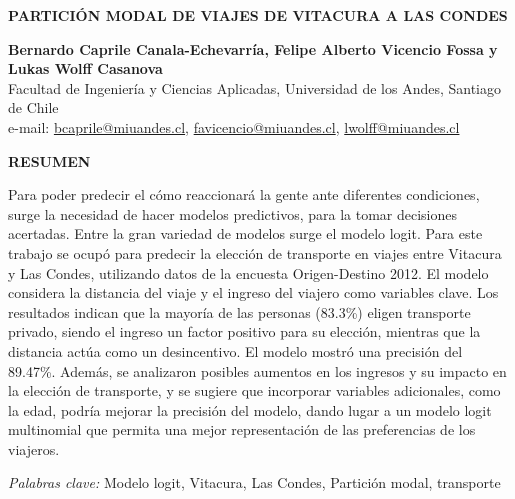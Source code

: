 \documentclass[letterpaper,12pt]{article}
\begin{document}
\begin{titlepage}
    \begin{center}
        
    
    \vspace*{1cm}


    \textbf{\Large PARTICIÓN MODAL DE VIAJES DE VITACURA A LAS CONDES}
  
    \vspace{1cm}
    
    \textbf{Bernardo Caprile Canala-Echevarría, Felipe Alberto Vicencio Fossa y Lukas Wolff Casanova}\\
    Facultad de Ingeniería y Ciencias Aplicadas, Universidad de los Andes, Santiago de Chile\\
    e-mail: \href{mailto:bcaprile@miuandes.cl}{bcaprile@miuandes.cl}, \href{mailto:favicencio@miuandes.cl}{favicencio@miuandes.cl}, \href{mailto:lwolff@miuandes.cl}{lwolff@miuandes.cl}
    
    \vspace{2cm}
    
    \textbf{RESUMEN}
    \end{center}
    \vspace{0.5cm}
    
    Para poder predecir el cómo reaccionará la gente ante diferentes condiciones, surge la necesidad de hacer modelos predictivos, para la tomar decisiones acertadas. Entre la gran variedad de modelos surge el modelo logit. Para este trabajo se ocupó para predecir la elección de transporte en viajes entre Vitacura y Las Condes, utilizando datos de la encuesta Origen-Destino 2012. El modelo considera la distancia del viaje y el ingreso del viajero como variables clave. Los resultados indican que la mayoría de las personas (83.3\%) eligen transporte privado, siendo el ingreso un factor positivo para su elección, mientras que la distancia actúa como un desincentivo. El modelo mostró una precisión del 89.47\%. Además, se analizaron posibles aumentos en los ingresos y su impacto en la elección de transporte, y se sugiere que incorporar variables adicionales, como la edad, podría mejorar la precisión del modelo, dando lugar a un modelo logit multinomial que permita una mejor representación de las preferencias de los viajeros.


    \vspace{1cm}
    
    \textit{Palabras clave:} Modelo logit, Vitacura, Las Condes, Partición modal, transporte
    
\end{titlepage}

\newpage








\end{document}

